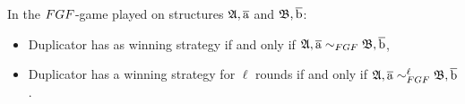 \begin{lemma}
  In the $\FGF$-game played on structures ${\mathfrak{A}}, \overline{\mathrm{a}}$ and ${\mathfrak{B}}, \overline{\mathrm{b}}$:
  \begin{itemize}
    \item Duplicator has as winning strategy if and only if $\str{A}, \elemtuplea \bisimto_{\FGF} \str{B}, \elemtupleb$,
    \item Duplicator has a winning strategy for $\ell$ rounds if and only if $\str{A}, \elemtuplea \bisimto_{\FGF}^{\ell} \str{B}, \elemtupleb$.
  \end{itemize}
\end{lemma}
